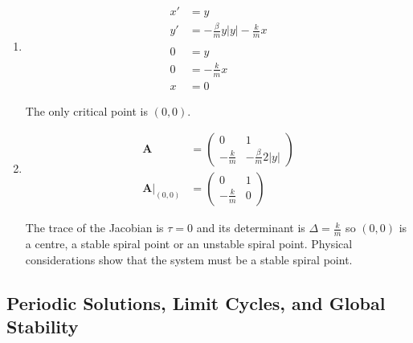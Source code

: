 \documentclass{article}
\begin{document}
\begin{enumerate}
  \item

        \begin{align*}
          x' & = y                                      \\
          y' & = -\frac{\beta}{m} y |y| - \frac{k}{m} x \\ \\
          0  & = y                                      \\
          0  & = -\frac{k}{m} x                         \\
          x  & = 0
        \end{align*}

        The only critical point is $(0, 0)$.

  \item

        \begin{align*}
          \mathbf{A}                         & = \begin{pmatrix}
                                                   0            & 1                      \\
                                                   -\frac{k}{m} & -\frac{\beta}{m} 2 |y|
                                                 \end{pmatrix} \\
          \left. \mathbf{A} \right|_{(0, 0)} & = \begin{pmatrix}
                                                   0            & 1 \\
                                                   -\frac{k}{m} & 0
                                                 \end{pmatrix}
        \end{align*}

        The trace of the Jacobian is $\tau = 0$ and its determinant is $\Delta = \frac{k}{m}$ so $(0, 0)$ is a centre, a stable spiral point or an unstable spiral point. Physical considerations show that the system must be a stable spiral point.
\end{enumerate}

\subsection{Periodic Solutions, Limit Cycles, and Global Stability}

\subsubsection{}
\end{document}
